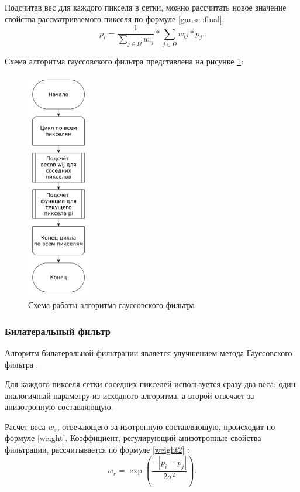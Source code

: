 Подсчитав вес для каждого пикселя в сетки, можно рассчитать новое значение свойства рассматриваемого пикселя по формуле \ref{gauss::final}:
\begin{equation}
	\label{gauss::final}
	p_i = \frac{1}{\sum_{j \in \Omega}^{} w_{ij}} * \sum_{j \in \Omega}^{} w_{ij} * p_j.
\end{equation}

Схема алгоритма гауссовского фильтра представлена на рисунке \ref{fig::gauss}:
\FloatBarrier
\begin{figure}[h]	
	\begin{center}
		\includegraphics[height=10cm]{inc/pdf/gauss.pdf}
	\end{center}
	\captionsetup{justification=centering}
	\caption{Схема работы алгоритма гауссовского фильтра}
	\label{fig::gauss}
\end{figure}
\FloatBarrier

\subsubsection{Билатеральный фильтр}
Алгоритм билатеральной фильтрации является улучшением метода Гауссовского фильтра \cite{bilateral}.

Для каждого пикселя сетки соседних пикселей используется сразу два веса: один аналогичный параметру из исходного алгоритма, а второй отвечает за анизотропную составляющую. 

Расчет веса $w_s$, отвечающего за изотропную составляющую, происходит по формуле \eqref{weight}. 
Коэффициент, регулирующий анизотропные свойства фильтрации, рассчитывается по формуле \eqref{weight2} \cite{bilateral}:
\begin{equation}
	\label{weight2}
	w_{r} = \exp\left(\frac{-|p_i - p_j|}{2\sigma^2}\right).
\end{equation}

